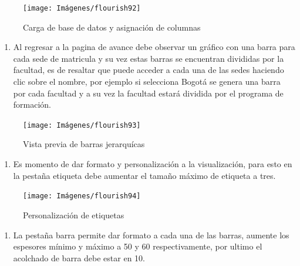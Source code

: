 \documentclass[
]{book}
\providecommand{\tightlist}{%
  \setlength{\itemsep}{0pt}\setlength{\parskip}{0pt}}
\begin{document}
\begin{figure}

{\centering \texttt{[image: Imágenes/flourish92]} 

}

\caption{Carga de base de datos y asignación de columnas}\label{fig:paso1jerarquiaflourish-fig}
\end{figure}

\begin{enumerate}
\def\labelenumi{\arabic{enumi}.}
\setcounter{enumi}{1}
\tightlist
\item
  Al regresar a la pagina de avance debe observar un gráfico con una barra para cada sede de matricula y su vez estas barras se encuentran divididas por la facultad, es de resaltar que puede acceder a cada una de las sedes haciendo clic sobre el nombre, por ejemplo si selecciona Bogotá se genera una barra por cada facultad y a su vez la facultad estará dividida por el programa de formación.
\end{enumerate}

\begin{figure}

{\centering \texttt{[image: Imágenes/flourish93]} 

}

\caption{Vista previa de barras jerarquícas}\label{fig:paso2jerarquiaflourish-fig}
\end{figure}

\begin{enumerate}
\def\labelenumi{\arabic{enumi}.}
\setcounter{enumi}{2}
\tightlist
\item
  Es momento de dar formato y personalización a la visualización, para esto en la pestaña etiqueta debe aumentar el tamaño máximo de etiqueta a tres.
\end{enumerate}

\begin{figure}

{\centering \texttt{[image: Imágenes/flourish94]} 

}

\caption{Personalización de etiquetas}\label{fig:paso3jerarquiaflourish-fig}
\end{figure}

\begin{enumerate}
\def\labelenumi{\arabic{enumi}.}
\setcounter{enumi}{3}
\tightlist
\item
  La pestaña barra permite dar formato a cada una de las barras, aumente los espesores mínimo y máximo a 50 y 60 respectivamente, por ultimo el acolchado de barra debe estar en 10.
\end{enumerate}
\end{document}
